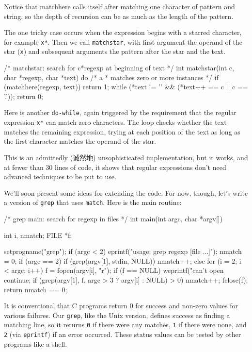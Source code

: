 Notice that matchhere calls itself after matching one character of pattern
and string, so the depth of recursion can be as much as the length of the
pattern.

The one tricky case occurs when the expression begins with a starred
character, for example \verb'x*'. Then we call \verb'matchstar', with first
argument the operand of the star (\verb'x') and subsequent arguments the
pattern after the star and the text.
\begin{wellcode}
    /* matchstar: search for c*regexp at beginning of text */
    int matchstar(int c, char *regexp, char *text)
    {
        do {    /* a * matches zero or more instances */
            if (matchhere(regexp, text))
                return 1;
        } while (*text != '\0' && (*text++ == c || c == '.'));
        return 0;
    }
\end{wellcode}
Here is another \verb'do-while', again triggered by the requirement that
the regular expression \verb'x*' can match zero characters. The loop checks
whether the text matches the remaining expression, trying at each position
of the text as long as the first character matches the operand of the star.

This is an admittedly (诚然地) unsophisticated implementation, but it
works, and at fewer than 30 lines of code, it shows that regular
expressions don't need advanced techniques to be put to use.

We'll soon present some ideas for extending the code. For now, though,
let's write a version of \verb'grep' that uses \verb'match'. Here is the
main routine:
\begin{wellcode}
    /* grep main: search for regexp in files */
    int main(int argc, char *argv[])
    {
        int     i, nmatch;
        FILE    *f;

        setprogname("grep");
        if (argc < 2)
            eprintf("usage: grep regexp [file ...]");
        nmatch = 0;
        if (argc == 2) {
            if (grep(argv[1], stdin, NULL))
                nmatch++;
        } else {
            for (i = 2; i < argc; i++) {
                f = fopen(argv[i], "r");
                if (f == NULL) {
                    weprintf("can't open %
                    continue;
                }
                if (grep(argv[1], f, argc > 3 ? argv[i] : NULL) > 0)
                    nmatch++;
                fclose(f);
            }
        }
        return nmatch == 0;
    }
\end{wellcode}
It is conventional that C programs return 0 for success and non-zero values
for various failures. Our \verb'grep', like the Unix version, defines
success as finding a matching line, so it returns \verb'0' if there were
any matches, \verb'1' if there were none, and \verb'2' (via \verb'eprintf')
if an error occurred. These status values can be tested by other programs
like a shell.

